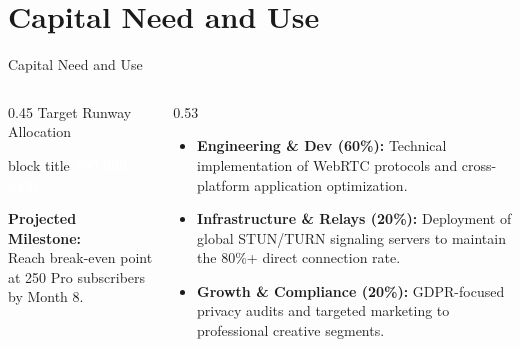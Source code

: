 \documentclass[aspectratio=169]{beamer}
\begin{document}
\section{Capital Need and Use}
\begin{frame}{Capital Need and Use}
    \begin{columns}
        \begin{column}{0.45\textwidth}
            \centering
            Target Runway Allocation
            \vspace{0.3cm}
            \begin{beamercolorbox}[center,rounded=true,sep=0.4cm]{block title}
                \textcolor{white}{\Large \textbf{500,000 SEK}}
            \end{beamercolorbox}
            \vspace{0.4cm}
            \small \textbf{Projected Milestone:}\\ Reach break-even point at 250 Pro subscribers by Month 8.
        \end{column}

        \begin{column}{0.53\textwidth}
            \begin{itemize}
                \small
                \item \textbf{Engineering \& Dev (60\%):} Technical implementation of WebRTC protocols and cross-platform application optimization.
                \item \textbf{Infrastructure \& Relays (20\%):} Deployment of global STUN/TURN signaling servers to maintain the 80\%+ direct connection rate.
                \item \textbf{Growth \& Compliance (20\%):} GDPR-focused privacy audits and targeted marketing to professional creative segments.
            \end{itemize}
        \end{column}
    \end{columns}
\end{frame}

\end{document}
